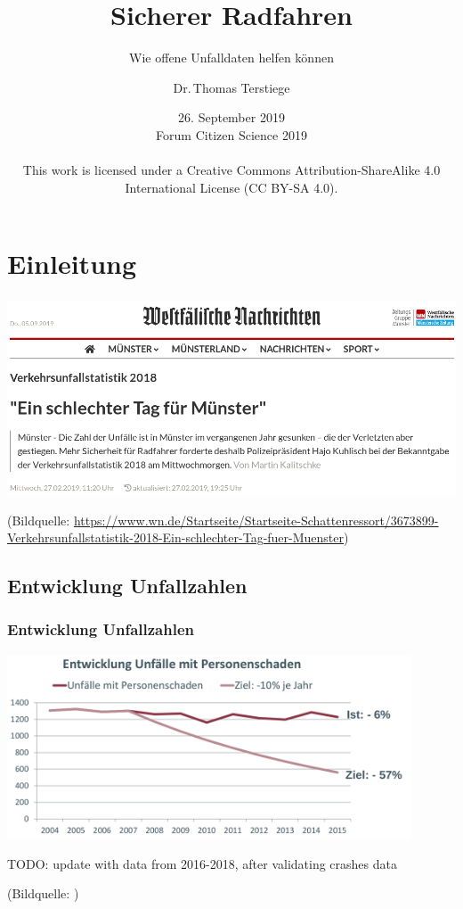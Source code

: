\documentclass{beamer}
\title{Sicherer Radfahren}
\subtitle{Wie offene Unfalldaten helfen können}
\author[Dr.\,Thomas Terstiege]{Dr.\,Thomas Terstiege}
\institute[Code for Münster]{Code for Münster}
\date{26. September 2019\\{\scriptsize{}Forum Citizen Science 2019\\		\ccLogo\ccAttribution\ccShareAlike\\
		{\tiny This work is licensed under a Creative Commons Attribution-ShareAlike 4.0 International License (CC BY-SA 4.0).} }}%
\begin{document}
\frame{
  \titlepage
}

\section*{Einleitung}

\begin{frame}
  \frametitle{}
  \framesubtitle{}  
  
  \includegraphics[width=\textwidth]{img/WN-screenshot.png}
  

  
  \vfill
  {\scriptsize (Bildquelle: \url{https://www.wn.de/Startseite/Startseite-Schattenressort/3673899-Verkehrsunfallstatistik-2018-Ein-schlechter-Tag-fuer-Muenster})\par}
\end{frame}

\subsection{Entwicklung Unfallzahlen}

\begin{frame}
  \frametitle{Entwicklung Unfallzahlen}

  \centering
  
  \includegraphics[width=0.9\textwidth]{img/unfaelle-personenschaden-2004-2015.png}
  
  TODO: update with data from 2016-2018, after validating crashes data
  
  
  
    {\scriptsize (Bildquelle: \citealt[Folie~4]{Brockmann2017})\par}
\end{frame}
\end{document}
